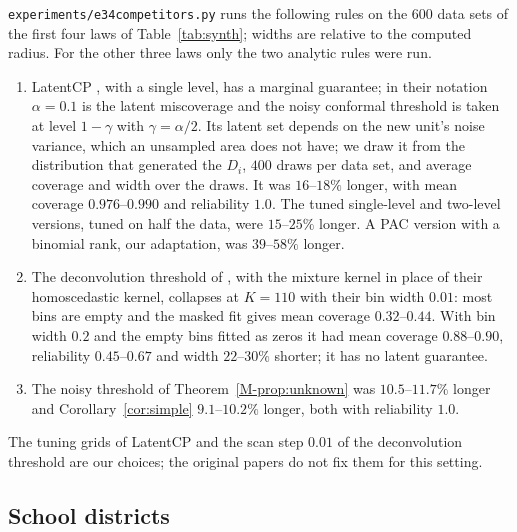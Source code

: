 \documentclass[11pt]{article}
\renewcommand{\_}{\usc\allowbreak}
\begin{document}
\texttt{experiments/e34\_competitors.py} runs the following rules on the $600$ data sets of the first four laws of Table~\ref{tab:synth}; widths are relative to the computed radius. For the other three laws only the two analytic rules were run.
\begin{enumerate}
\item LatentCP \citep{zheng2026}, with a single level, has a marginal guarantee; in their notation $\alpha = 0.1$ is the latent miscoverage and the noisy conformal threshold is taken at level $1 - \gamma$ with $\gamma = \alpha/2$. Its latent set depends on the new unit's noise variance, which an unsampled area does not have; we draw it from the distribution that generated the $D_i$, $400$ draws per data set, and average coverage and width over the draws. It was $16$--$18\%$ longer, with mean coverage $0.976$--$0.990$ and reliability $1.0$. The tuned single-level and two-level versions, tuned on half the data, were $15$--$25\%$ longer. A PAC version with a binomial rank, our adaptation, was $39$--$58\%$ longer.
\item The deconvolution threshold of \citet{cohen2025}, with the mixture kernel in place of their homoscedastic kernel, collapses at $K = 110$ with their bin width $0.01$: most bins are empty and the masked fit gives mean coverage $0.32$--$0.44$. With bin width $0.2$ and the empty bins fitted as zeros it had mean coverage $0.88$--$0.90$, reliability $0.45$--$0.67$ and width $22$--$30\%$ shorter; it has no latent guarantee.
\item The noisy threshold of Theorem~\ref{M-prop:unknown} was $10.5$--$11.7\%$ longer and Corollary~\ref{cor:simple} $9.1$--$10.2\%$ longer, both with reliability $1.0$.
\end{enumerate}
The tuning grids of LatentCP and the scan step $0.01$ of the deconvolution threshold are our choices; the original papers do not fix them for this setting.

\subsection*{School districts}
\end{document}
